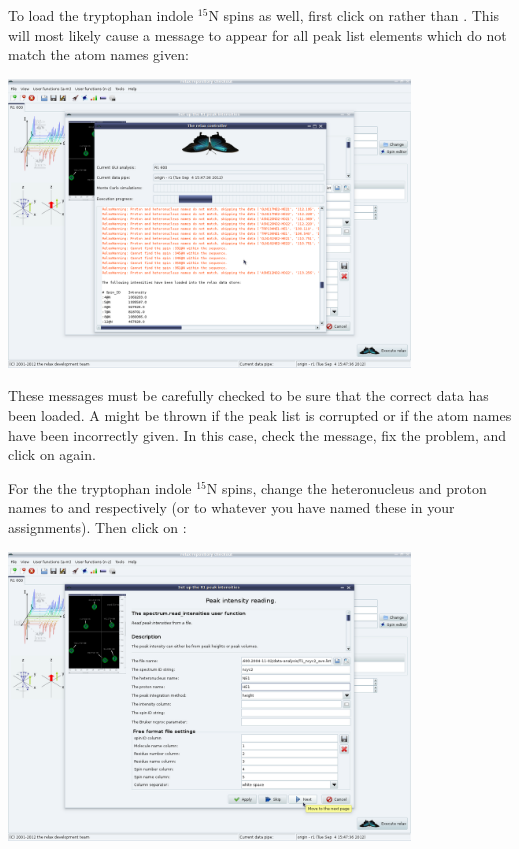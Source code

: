 To load the tryptophan indole $^{15}$N spins as well, first click on  rather than .  This will most likely cause a  message to appear for all peak list elements which do not match the atom names given:

\begin{minipage}[h]{\linewidth}
\centerline{\includegraphics[width=0.8\textwidth, bb=14 14 1415 1019]{graphics/screenshots/r1_analysis/peak_intensity_warnings}}
\end{minipage}

These messages must be carefully checked to be sure that the correct data has been loaded.  A  might be thrown if the peak list is corrupted or if the atom names have been incorrectly given.  In this case, check the message, fix the problem, and click on  again.

For the the tryptophan indole $^{15}$N spins, change the heteronucleus and proton names to  and  respectively (or to whatever you have named these in your assignments).  Then click on :

\begin{minipage}[h]{\linewidth}
\centerline{\includegraphics[width=0.8\textwidth, bb=14 14 1415 1019]{graphics/screenshots/r1_analysis/peak_intensity_trp_peaks}}
\end{minipage}

